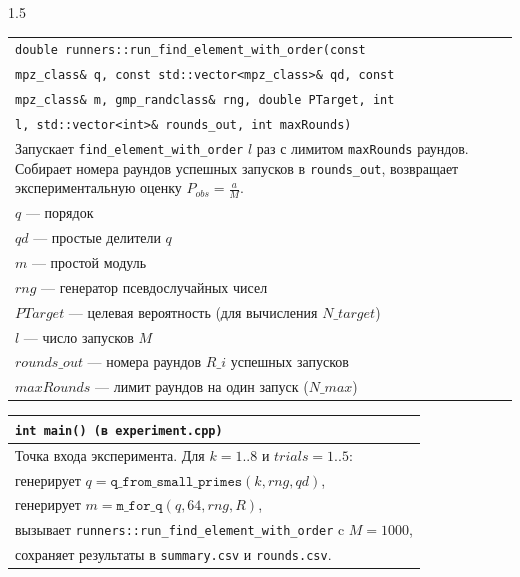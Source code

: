 \documentclass[14pt,a4paper]{extarticle}
\begin{document}
\begin{spacing}{1.5}
\vspace{0.2cm}
\noindent\begin{tabularx}{\textwidth}{|X|}
\hline
\texttt{double runners::run\_find\_element\_with\_order(const}\\
\texttt{mpz\_class\& q, const std::vector<mpz\_class>\& qd, const}\\
\texttt{mpz\_class\& m, gmp\_randclass\& rng, double PTarget, int}\\
\texttt{l, std::vector<int>\& rounds\_out, int maxRounds)} \\
\hline
Запускает \texttt{find\_element\_with\_order} \(l\) раз с лимитом \texttt{maxRounds} раундов. Собирает номера раундов успешных запусков в \texttt{rounds\_out}, возвращает экспериментальную оценку \(P_{obs} = \frac{a}{M}\). \\
\(q\) \hspace{1.5cm} — порядок \\
\(qd\) \hspace{1.3cm} — простые делители \(q\) \\
\(m\) \hspace{1.4cm} — простой модуль \\
\(rng\) \hspace{1.2cm} — генератор псевдослучайных чисел \\
\(PTarget\) \hspace{0.4cm} — целевая вероятность (для вычисления \(N\_target\)) \\
\(l\) \hspace{1.6cm} — число запусков \(M\) \\
\(rounds\_out\) — номера раундов \(R\_i\) успешных запусков \\
\(maxRounds\) — лимит раундов на один запуск (\(N\_max\)) \\
\hline
\end{tabularx}

\vspace{0.2cm}
\noindent\begin{tabularx}{\textwidth}{|X|}
\hline
\texttt{int main() (в experiment.cpp)} \\
\hline
Точка входа эксперимента. Для \(k = 1..8\) и \(trials = 1..5\): \\
\hspace{0.5cm} генерирует \(q = \texttt{q\_from\_small\_primes}(k, rng, qd)\), \\
\hspace{0.5cm} генерирует \(m = \texttt{m\_for\_q}(q, 64, rng, R)\), \\
\hspace{0.5cm} вызывает \texttt{runners::run\_find\_element\_with\_order} c \(M = 1000\), \\
\hspace{0.5cm} сохраняет результаты в \texttt{summary.csv} и \texttt{rounds.csv}. \\
\hline
\end{tabularx}


\end{spacing}
\end{document}
